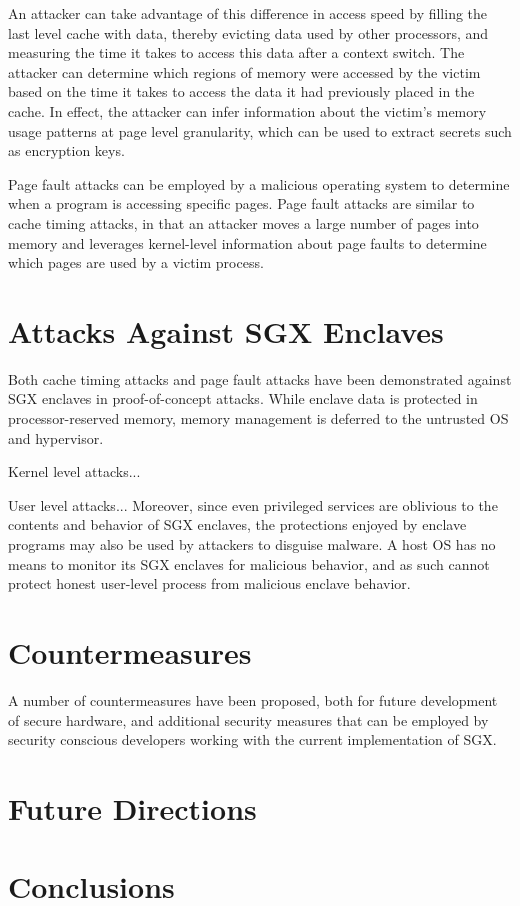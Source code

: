 An attacker can take advantage of this difference in access speed by filling the last level cache with data, thereby evicting data used by other processors, and measuring the time it takes to access this data after a context switch. The attacker can determine which regions of memory were accessed by the victim based on the time it takes to access the data it had previously placed in the cache. In effect, the attacker can infer information about the victim's memory usage patterns at page level granularity, which can be used to extract secrets such as encryption keys.

Page fault attacks can be employed by a malicious operating system to determine when a program is accessing specific pages. Page fault attacks are similar to cache timing attacks, in that an attacker moves a large number of pages into memory and leverages kernel-level information about page faults to determine which pages are used by a victim process.

\section{Attacks Against SGX Enclaves}

Both cache timing attacks and page fault attacks have been demonstrated against SGX enclaves in proof-of-concept attacks. While enclave data is protected in processor-reserved memory, memory management is deferred to the untrusted OS and hypervisor. 

Kernel level attacks...

User level attacks... Moreover, since even privileged services are oblivious to the contents and behavior of SGX enclaves, the protections enjoyed by enclave programs may also be used by attackers to disguise malware. A host OS has no means to monitor its SGX enclaves for malicious behavior, and as such cannot protect honest user-level process from malicious enclave behavior. 

\section{Countermeasures}

A number of countermeasures have been proposed, both for future development of secure hardware, and additional security measures that can be employed by security conscious developers working with the current implementation of SGX.

\section{Future Directions}

\section{Conclusions}
